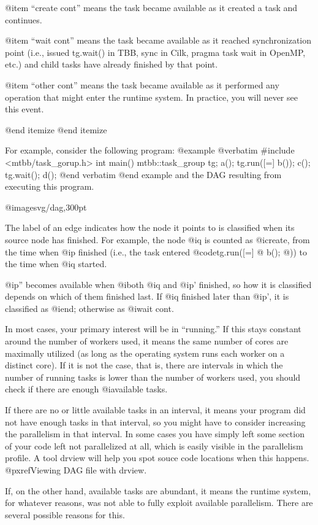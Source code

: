 @item ``create cont'' means the task became available as it created a task and continues.

@item ``wait cont'' means the task became available as it reached synchronization point (i.e., issued tg.wait() in TBB, sync in Cilk, pragma task wait in OpenMP, etc.) and child tasks have already finished by that point.

@item ``other cont'' means the task became available as it performed any operation that might enter the runtime system.  In practice, you will never see this event.

@end itemize
@end itemize

For example, consider the following program:
@example
@verbatim
#include <mtbb/task_gorup.h>
int main() {
  mtbb::task_group tg;
  a();
  tg.run([=] b());
  c();
  tg.wait();
  d();
}
@end verbatim
@end example
and the DAG resulting from executing this program.

@image{svg/dag,300pt}

The label of an edge indicates how the node it points to is classified
when its source node has finished.  For example, the node @i{q} is
counted as @i{create}, from the time when @i{p} finished (i.e., the task
entered @code{tg.run([=] @{ b(); @})}) to the time when @i{q} started.

@i{p''} becomes available when @i{both} @i{q} and @i{p'} finished, so
how it is classified depends on which of them finished last.  If @i{q}
finished later than @i{p'}, it is classified as @i{end}; otherwise as
@i{wait cont}.

In most cases, your primary interest will be in ``running.''  If this
stays constant around the number of workers used, it means the same
number of cores are maximally utilized (as long as the operating system
runs each worker on a distinct core).  If it is not the case, that is,
there are intervals in which the number of running tasks is lower than
the number of workers used, you should check if there are enough
@i{available} tasks.

If there are no or little available tasks in an interval, it means your
program did not have enough tasks in that interval, so you might have to
consider increasing the parallelism in that interval.  In some cases you
have simply left some section of your code left not parallelized at all,
which is easily visible in the parallelism profile.  A tool drview will
help you spot souce code locations when this happens.  
@pxref{Viewing DAG file with drview}.

If, on the other hand, available tasks are abundant, it means the
runtime system, for whatever reasons, was not able to fully exploit
available parallelism.  There are several possible reasons for this.

